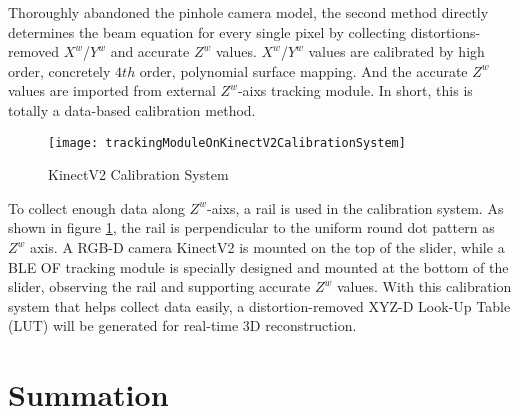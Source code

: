 Thoroughly abandoned the pinhole camera model, the second method directly determines the beam equation for every single pixel by collecting distortions-removed \(X^{w}\)/\(Y^{w}\) and accurate \(Z^{w}\) values. \(X^{w}\)/\(Y^{w}\) values are calibrated by high order, concretely \(4th\) order, polynomial surface mapping. And the accurate \(Z^{w}\) values are imported from external \(Z^{w}\)-aixs tracking module. In short, this is totally a data-based calibration method.%
%
\begin{figure}[H]
\centering
\texttt{[image: trackingModuleOnKinectV2CalibrationSystem]}
\caption{KinectV2 Calibration System}
\label{trackingModuleOnKinectV2CalibrationSystem}
\end{figure}%
%
\noindent
To collect enough data along \(Z^{w}\)-aixs, a rail is used in the calibration system. As shown in figure \ref{trackingModuleOnKinectV2CalibrationSystem}, the rail is perpendicular to the uniform round dot pattern as \(Z^{w}\) axis. A RGB-D camera KinectV2 is mounted on the top of the slider, while a BLE OF tracking module is specially designed and mounted at the bottom of the slider, observing the rail and supporting accurate \(Z^{w}\) values. With this calibration system that helps collect data easily, a distortion-removed XYZ-D Look-Up Table (LUT) will be generated for real-time 3D reconstruction.%

\section{Summation}

